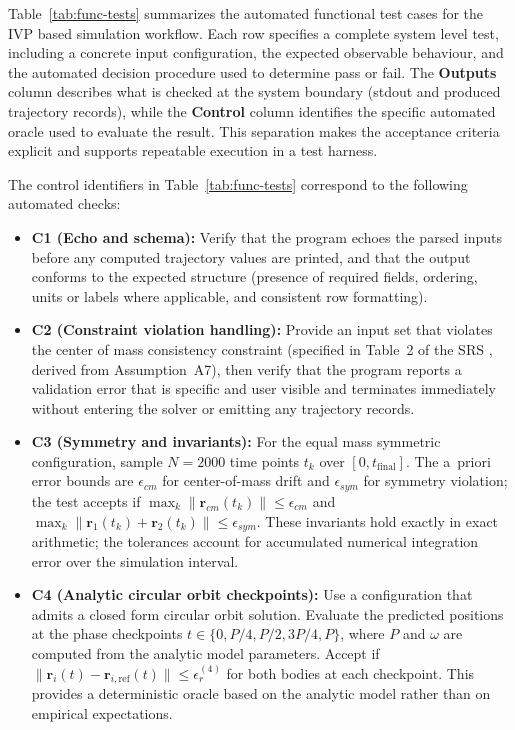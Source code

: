 \documentclass[12pt, titlepage]{article}
\begin{document}
Table~\ref{tab:func-tests} summarizes the automated functional test cases for
the IVP based simulation workflow. Each row specifies a complete system level
test, including a concrete input configuration, the expected observable
behaviour, and the automated decision procedure used to determine pass or fail.
The \textbf{Outputs} column describes what is checked at the system boundary
(stdout and produced trajectory records), while the \textbf{Control} column
identifies the specific automated oracle used to evaluate the result. This
separation makes the acceptance criteria explicit and supports repeatable
execution in a test harness.

The control identifiers in Table~\ref{tab:func-tests} correspond to the
following automated checks:

\begin{itemize}
  \item \textbf{C1 (Echo and schema):} Verify that the program echoes the parsed
  inputs before any computed trajectory values are printed, and that the output
  conforms to the expected structure (presence of required fields, ordering,
  units or labels where applicable, and consistent row formatting).

  \item \textbf{C2 (Constraint violation handling):} Provide an input set that
  violates the center of mass consistency constraint (specified in Table~2 of
  the SRS \citep{SRS}, derived from Assumption~A7), then verify that the program
  reports a validation error that is specific and user visible and terminates
  immediately without entering the solver or emitting any trajectory records.

  \item \textbf{C3 (Symmetry and invariants):} For the equal mass symmetric
  configuration, sample $N=2000$ time points $t_k$ over
  $[0, t_{\text{final}}]$. The a~priori error bounds are
  $\epsilon_{cm}$ for center-of-mass drift and $\epsilon_{sym}$ for symmetry
  violation; the test accepts if
  $\max_k \lVert \mathbf{r}_{cm}(t_k)\rVert \le \epsilon_{cm}$ and
  $\max_k \lVert \mathbf{r}_1(t_k)+\mathbf{r}_2(t_k)\rVert \le \epsilon_{sym}$.
  These invariants hold exactly in exact arithmetic; the tolerances account for
  accumulated numerical integration error over the simulation interval.

  \item \textbf{C4 (Analytic circular orbit checkpoints):} Use a configuration
  that admits a closed form circular orbit solution. Evaluate the predicted
  positions at the phase checkpoints $t \in \{0, P/4, P/2, 3P/4, P\}$, where
  $P$ and $\omega$ are computed from the analytic model parameters. Accept if
  $\lVert \mathbf{r}_i(t)-\mathbf{r}_{i,\text{ref}}(t)\rVert \le \epsilon_r^{(4)}$
  for both bodies at each checkpoint. This provides a deterministic oracle
  based on the analytic model rather than on empirical expectations.


\end{itemize}
\end{document}
